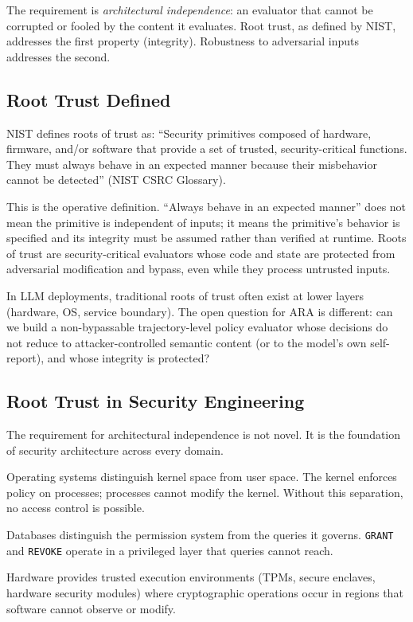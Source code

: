 \documentclass[11pt]{article}
\theoremstyle{definition}
\theoremstyle{plain}
\theoremstyle{remark}
\begin{document}
The requirement is \emph{architectural independence}: an evaluator that cannot be corrupted or fooled by the content it evaluates. Root trust, as defined by NIST, addresses the first property (integrity). Robustness to adversarial inputs addresses the second.

\subsection{Root Trust Defined}

NIST defines roots of trust as: ``Security primitives composed of hardware, firmware, and/or software that provide a set of trusted, security-critical functions. They must always behave in an expected manner because their misbehavior cannot be detected'' (NIST CSRC Glossary).

This is the operative definition. ``Always behave in an expected manner'' does not mean the primitive is independent of inputs; it means the primitive's behavior is specified and its integrity must be assumed rather than verified at runtime. Roots of trust are security-critical evaluators whose code and state are protected from adversarial modification and bypass, even while they process untrusted inputs.

In LLM deployments, traditional roots of trust often exist at lower layers (hardware, OS, service boundary). The open question for ARA is different: can we build a non-bypassable trajectory-level policy evaluator whose decisions do not reduce to attacker-controlled semantic content (or to the model's own self-report), and whose integrity is protected?

\subsection{Root Trust in Security Engineering}

The requirement for architectural independence is not novel. It is the foundation of security architecture across every domain.

Operating systems distinguish kernel space from user space. The kernel enforces policy on processes; processes cannot modify the kernel. Without this separation, no access control is possible.

Databases distinguish the permission system from the queries it governs. \texttt{GRANT} and \texttt{REVOKE} operate in a privileged layer that queries cannot reach.

Hardware provides trusted execution environments (TPMs, secure enclaves, hardware security modules) where cryptographic operations occur in regions that software cannot observe or modify.
\end{document}
